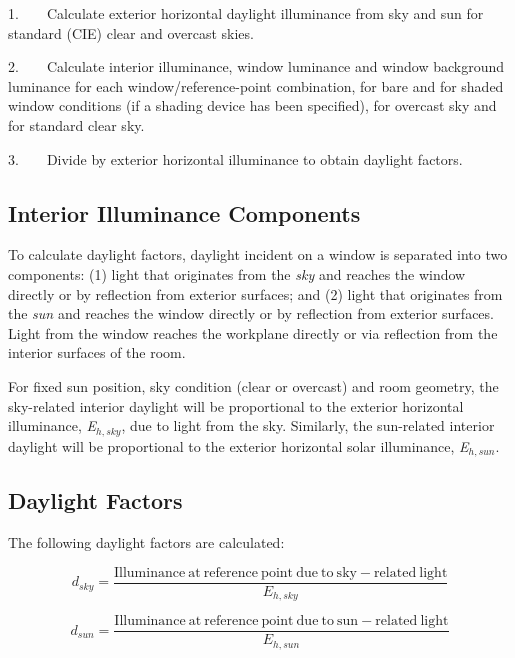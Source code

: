 1.~~~~Calculate exterior horizontal daylight illuminance from sky and sun for standard (CIE) clear and overcast skies.

2.~~~~Calculate interior illuminance, window luminance and window background luminance for each window/reference-point combination, for bare and for shaded window conditions (if a shading device has been specified), for overcast sky and for standard clear sky.

3.~~~~Divide by exterior horizontal illuminance to obtain daylight factors.

\subsection{Interior Illuminance Components}\label{interior-illuminance-components}

To calculate daylight factors, daylight incident on a window is separated into two components: (1) light that originates from the \emph{sky} and reaches the window directly or by reflection from exterior surfaces; and (2) light that originates from the \emph{sun} and reaches the window directly or by reflection from exterior surfaces. Light from the window reaches the workplane directly or via reflection from the interior surfaces of the room.

For fixed sun position, sky condition (clear or overcast) and room geometry, the sky-related interior daylight will be proportional to the exterior horizontal illuminance, \emph{E\(_{h,sky}\)}, due to light from the sky. Similarly, the sun-related interior daylight will be proportional to the exterior horizontal solar illuminance, \emph{E\(_{h,sun}\)}.

\subsection{Daylight Factors}\label{daylight-factors}

The following daylight factors are calculated:

\begin{equation}
{d_{sky}} = \frac{{{\mathrm{Illuminance~at~reference~point~due~to~sky-related~light}}}}{{{E_{h,sky}}}}
\end{equation}

\begin{equation}
{d_{sun}} = \frac{{{\mathrm{Illuminance~at~reference~point~due~to~sun-related~light}}}}{{{E_{h,sun}}}}
\end{equation}

